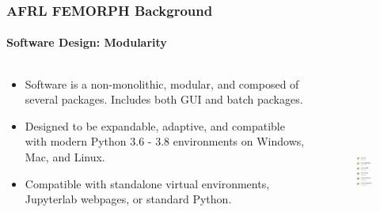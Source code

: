 \documentclass[t]{beamer}
\begin{document}
\begin{frame}
  \frametitle{AFRL FEMORPH Background}
  \framesubtitle{Software Design: Modularity}

  \vspace{-5mm}
  \begin{columns}

    \begin{column}{0.6\textwidth}
      \begin{itemize}
      \item Software is a non-monolithic, modular, and composed of several packages.  Includes both GUI and batch packages.
      \item Designed to be expandable, adaptive, and compatible with modern Python 3.6 - 3.8 environments on Windows, Mac, and Linux.
      \item Compatible with standalone virtual environments, Jupyterlab webpages, or standard Python.
      \end{itemize}
    \end{column}

    \begin{column}{0.4\textwidth}
      \vspace{-1.0mm}
      \begin{figure}
        \includegraphics[height=2.5in]{./figures/packages_azure_light.png}
      \end{figure}
    \end{column}

\end{columns}


\end{frame}
\end{document}
